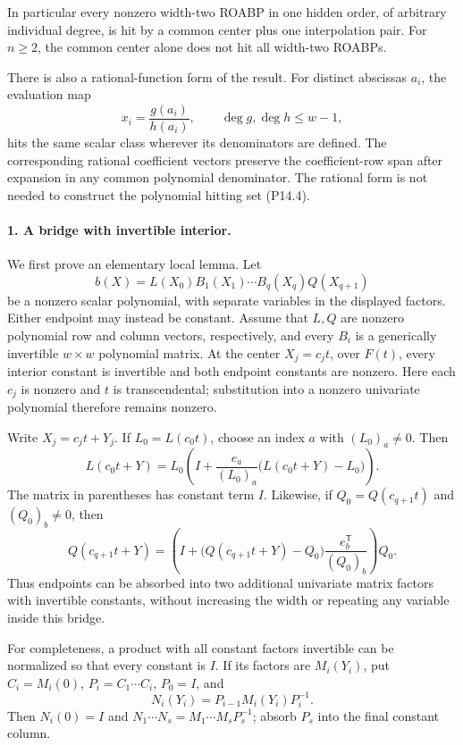 \documentclass[11pt,a4paper]{article}
\theoremstyle{definition}\newtheorem{definition}{Definition}
\begin{document}
In particular every nonzero width-two ROABP in one hidden order,
of arbitrary individual degree, is hit by a common center plus
one interpolation pair. For $n\geq2$, the common center alone
does not hit all width-two ROABPs.

There is also a rational-function form of the result. For distinct
abscissas $a_i$, the evaluation map
\[
 x_i=\frac{g(a_i)}{h(a_i)},\qquad
 \deg g,\deg h\leq w-1,
 \tag{P14.5}
\]
hits the same scalar class wherever its denominators are defined.
The corresponding rational coefficient vectors preserve the
coefficient-row span after expansion in any common polynomial
denominator. The rational form is not needed to construct the
polynomial hitting set (P14.4).

\paragraph{1. A bridge with invertible interior.}
We first prove an elementary local lemma. Let
\[
 b(X)=L(X_0)B_1(X_1)\cdots B_q(X_q)Q(X_{q+1})
 \tag{P14.6}
\]
be a nonzero scalar polynomial, with separate variables in the
displayed factors. Either endpoint may instead be constant.
Assume that $L,Q$ are nonzero polynomial row and column vectors,
respectively, and every $B_i$ is a generically invertible
$w\times w$ polynomial matrix. At the center $X_j=c_jt$, over
$F(t)$, every interior constant is invertible and both endpoint
constants are nonzero. Here each $c_j$ is nonzero and $t$ is
transcendental; substitution into a nonzero univariate polynomial
therefore remains nonzero.

Write $X_j=c_jt+Y_j$. If $L_0=L(c_0t)$, choose an index $a$ with
$(L_0)_a\ne0$. Then
\[
 L(c_0t+Y)=L_0\left(I+
       \frac{e_a}{(L_0)_a}\bigl(L(c_0t+Y)-L_0\bigr)\right).
 \tag{P14.7}
\]
The matrix in parentheses has constant term $I$. Likewise, if
$Q_0=Q(c_{q+1}t)$ and $(Q_0)_b\ne0$, then
\[
 Q(c_{q+1}t+Y)=\left(I+
       \bigl(Q(c_{q+1}t+Y)-Q_0\bigr)
                      \frac{e_b^{\mathsf T}}{(Q_0)_b}\right)Q_0.
 \tag{P14.8}
\]
Thus endpoints can be absorbed into two additional univariate
matrix factors with invertible constants, without increasing
the width or repeating any variable inside this bridge.

For completeness, a product with all constant factors invertible
can be normalized so that every constant is $I$. If its factors
are $M_i(Y_i)$, put $C_i=M_i(0)$, $P_i=C_1\cdots C_i$, $P_0=I$,
and
\[
 N_i(Y_i)=P_{i-1}M_i(Y_i)P_i^{-1}.
\]
Then $N_i(0)=I$ and
$N_1\cdots N_s=M_1\cdots M_sP_s^{-1}$; absorb $P_s$ into
the final constant column.
\end{document}
